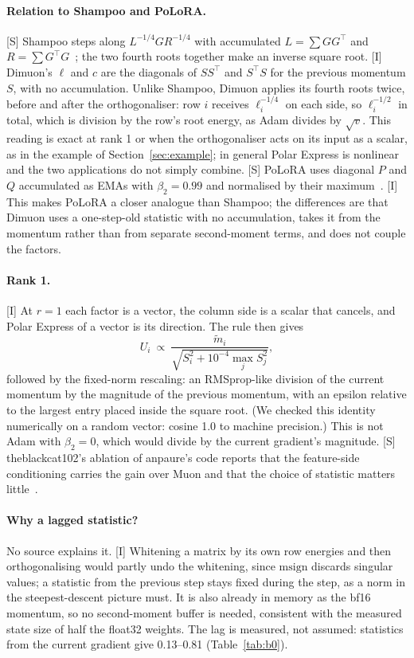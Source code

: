 \documentclass[11pt]{article}
\newcommand{\msign}{\mathrm{msign}}
\begin{document}
\paragraph{Relation to Shampoo and PoLoRA.} [S] Shampoo steps along $L^{-1/4}GR^{-1/4}$ with
accumulated $L=\sum GG^\top$ and $R=\sum G^\top G$~\cite{shampoo}; the two fourth roots together make
an inverse square root. [I] Dimuon's $\ell$ and $c$ are the diagonals of $SS^\top$ and $S^\top S$ for
the previous momentum $S$, with no accumulation. Unlike Shampoo, Dimuon applies its fourth roots
twice, before and after the orthogonaliser: row $i$ receives $\ell_i^{-1/4}$ on each side, so
$\ell_i^{-1/2}$ in total, which is division by the row's root energy, as Adam divides by $\sqrt v$.
This reading is exact at rank 1 or when the orthogonaliser acts on its input as a scalar, as in the
example of Section~\ref{sec:example}; in general Polar Express is nonlinear and the two applications do
not simply combine. [S] PoLoRA uses diagonal $P$ and $Q$ accumulated as EMAs with $\beta_2=0.99$ and
normalised by their maximum~\cite{polora}. [I] This makes PoLoRA a closer analogue than Shampoo; the
differences are that Dimuon uses a one-step-old statistic with no accumulation, takes it from the
momentum rather than from separate second-moment terms, and does not couple the factors.

\paragraph{Rank 1.} [I] At $r=1$ each factor is a vector, the column side is a scalar that cancels,
and Polar Express of a vector is its direction. The rule then gives
\[
U_i\ \propto\ \frac{\tilde m_i}{\sqrt{S_i^2+10^{-4}\max_jS_j^2}},
\]
followed by the fixed-norm rescaling: an RMSprop-like division of the current momentum by the
magnitude of the previous momentum, with an epsilon relative to the largest entry placed inside the
square root. (We checked this identity numerically on a random vector: cosine 1.0 to machine
precision.) This is not Adam with $\beta_2=0$, which would divide by the current gradient's magnitude.
[S] theblackcat102's ablation of anpaure's code reports that the feature-side conditioning carries the
gain over Muon and that the choice of statistic matters little~\cite{zrt}.

\paragraph{Why a lagged statistic?} No source explains it. [I] Whitening a matrix by its own row
energies and then orthogonalising would partly undo the whitening, since $\msign$ discards singular
values; a statistic from the previous step stays fixed during the step, as a norm in the
steepest-descent picture must. It is also already in memory as the bf16 momentum, so no second-moment
buffer is needed, consistent with the measured state size of half the float32 weights. The lag is
measured, not assumed: statistics from the current gradient give 0.13--0.81 (Table~\ref{tab:b0}).
\end{document}
